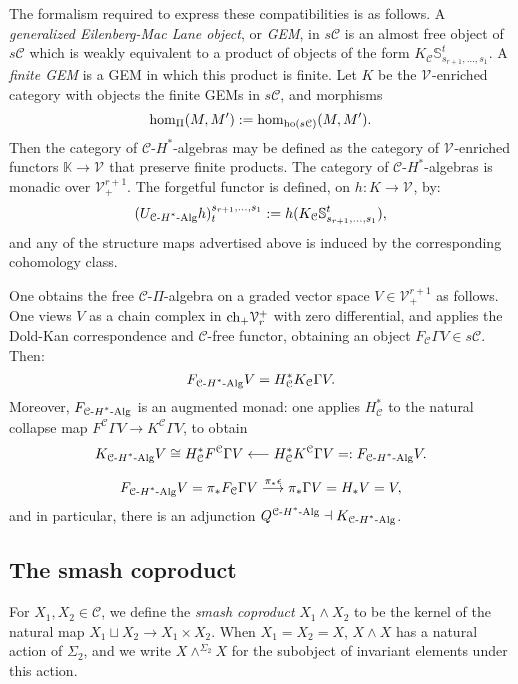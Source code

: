 \documentclass[11pt]{amsart}
\theoremstyle{plain}
\theoremstyle{definition}
\renewcommand{\to}{\longrightarrow}
\newcommand{\from}{\longleftarrow}
\newcommand{\calC}{\mathcal{C}}
\newcommand{\calV}{\mathcal{V}}
\newcommand{\calc}{\mathcal{C}}
\theoremstyle{plain}
\newcommand{\vect}[2]{\calV^{#1}_{#2}}
\newcommand{\HAlg}{\textup{-$H^*$-Alg}}
\newcommand{\complexes}{\textup{ch}_+}
\begin{document}
\begin{CPiAlgs and CHalgs}
The formalism required to express these compatibilities is as follows. A \emph{generalized Eilenberg-Mac Lane object}, or \emph{GEM}, in $s\calc$ is an almost free object of $s\calc$ which is weakly equivalent to a product of objects of the form $K_\calC\mathbb{S}_{s_{r+1},\ldots,s_{1}}^{t}$. A \emph{finite GEM} is a GEM in which this product is finite. Let $K$  be the $\vect{}{}$-enriched category with objects the finite GEMs in $s\calc$, and morphisms
\[\hom_{\Pi}(M,M'):=\hom_{\textup{ho}(s\calc)}(M,M').\]
Then the category of $\calc$-$H^*$-algebras  may be defined as the category of $\vect{}{}$-enriched functors $\mathbb{K}\to \vect{}{}$ that preserve finite products. The category of $\calc$-$H^*$-algebras is monadic over $\vect{r+1}{+}$. The forgetful functor is defined, on $h:K\to \vect{}{}$, by:%
\[(U_{\calc\HAlg}h)_t^{s_{r+1},\ldots,s_1}:=h(K_\calC\mathbb{S}_{s_{r+1},\ldots,s_{1}}^{t}),\]
and any of the structure maps advertised above is induced by the corresponding cohomology class. %

One obtains the free $\calc$-$\Pi$-algebra on a graded vector space $V\in \vect{r+1}{+}$ as follows. One views $V$ as a chain complex in $\complexes\vect{+}{r}$ with zero differential, and applies the Dold-Kan correspondence and $\calc$-free functor, obtaining an object $F_\calc\Gamma V\in s\calc$. Then:
\[F_{\calc\HAlg}V=H^*_{\calc}K_\calc\Gamma V.\]
Moreover, $F_{\calc\HAlg}$ is an augmented monad: one applies $H^*_{\calc}$ to the natural collapse map $F^{\calc}\Gamma V\to K^{\calc}\Gamma V$, to obtain
\[K_{\calc\HAlg}V\cong H^*_{\calc} F^{\calc}\Gamma V\from H^*_{\calc} K^{\calc}\Gamma V=:F_{\calc\HAlg}V.\]

\[F_{\calc\HAlg}V=\pi_*F_\calc\Gamma V\overset{\pi_*\epsilon}{\to}\pi_*\Gamma V=H_*V=V,\]
and in particular, there is an adjunction $Q^{\calc\HAlg}\dashv K_{\calc\HAlg}$.


\subsection{The smash coproduct}\label{subseq:The smash coproduct}
For $X_1,X_2\in\calc$, we define the \emph{smash coproduct} $X_1\wedge X_2$ to be the kernel of the natural map $X_1\sqcup X_2\to X_1\times X_2$. When $X_1=X_2=X$, $X\wedge X$ has a natural action of $\Sigma_2$, and we write $X\wedge^{\Sigma_2} X$ for the subobject of invariant elements under this action.


\end{CPiAlgs and CHalgs}
\end{document}
